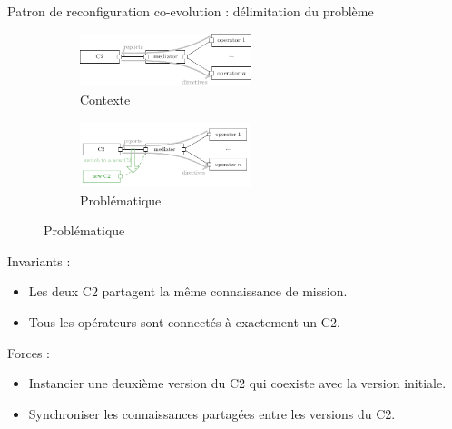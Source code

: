 \begin{frame}{Patron de reconfiguration co-evolution : délimitation du problème}
\begin{figure}
\begin{subfigure}[b]{0.45\textwidth}
\includegraphics[width=5cm]{imgs/dc-context}
\caption{Contexte}
\end{subfigure}
\begin{subfigure}[b]{0.45\textwidth}
\includegraphics[width=5cm]{imgs/dc_archi-C2}
\caption{Problématique}
\end{subfigure}
\end{figure}

Invariants :
\begin{itemize}
\item Les deux C2 partagent la même connaissance de mission.
\item Tous les opérateurs sont connectés à exactement un
C2. 
\end{itemize}

Forces :
\begin{itemize}
\item Instancier une deuxième version du C2 qui coexiste avec
la version initiale.
\item Synchroniser les connaissances partagées entre les versions du
C2.
\end{itemize}

\end{frame}


